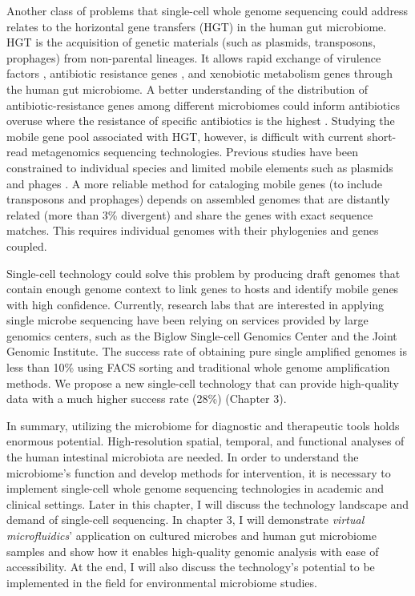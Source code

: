 Another class of problems that single-cell whole genome sequencing could address relates to the horizontal gene transfers (HGT) in the human gut microbiome. HGT is the acquisition of genetic materials (such as plasmids, transposons, prophages) from non-parental lineages. It allows rapid exchange of virulence factors \cite{Chen:2009cr}, antibiotic resistance genes \cite{Smillie:2011jc,Brito:2016cd}, and xenobiotic metabolism genes \cite{Hehemann:2010wk} through the human gut microbiome. A better understanding of the distribution of antibiotic-resistance genes among different microbiomes could inform antibiotics overuse where the resistance of specific antibiotics is the highest \cite{Brito:2016cd}. Studying the mobile gene pool associated with HGT, however, is difficult with current short-read metagenomics sequencing technologies. Previous studies have been constrained to individual species \cite{Coyne:2014ez} and limited mobile elements such as plasmids \cite{Jones:2010js} and phages \cite{Breitbart:2003uf}. A more reliable method for cataloging mobile genes (to include transposons and prophages) depends on assembled genomes that are distantly related (more than 3\% divergent) and share the genes with exact sequence matches. This requires individual genomes with their phylogenies and genes coupled. 

Single-cell technology could solve this problem by producing draft genomes that contain enough genome context to link genes to hosts and identify mobile genes with high confidence. Currently, research labs that are interested in applying single microbe sequencing have been relying on services provided by large genomics centers, such as the Biglow Single-cell Genomics Center and the Joint Genomic Institute. The success rate of obtaining pure single amplified genomes is less than 10\% using FACS sorting and traditional whole genome amplification methods. We propose a new single-cell technology that can provide high-quality data with a much higher success rate (28\%) (Chapter 3). 

In summary, utilizing the microbiome for diagnostic and therapeutic tools holds enormous potential. High-resolution spatial, temporal, and functional analyses of the human intestinal microbiota are needed. In order to understand the microbiome's function and develop methods for intervention, it is necessary to implement single-cell whole genome sequencing technologies in academic and clinical settings. Later in this chapter, I will discuss the technology landscape and demand of single-cell sequencing. In chapter 3, I will demonstrate \textit{virtual microfluidics}' application on cultured microbes and human gut microbiome samples and show how it enables high-quality genomic analysis with ease of accessibility. At the end, I will also discuss the technology's potential to be implemented in the field for environmental microbiome studies. 

